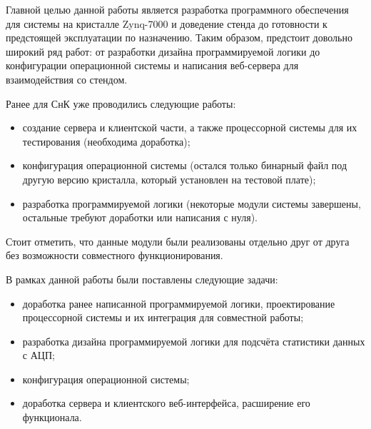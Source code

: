 Главной целью данной работы является разработка программного обеспечения для системы на кристалле Zynq-7000 и доведение стенда до готовности к предстоящей эксплуатации по назначению. Таким образом, предстоит довольно широкий ряд работ: от разработки дизайна программируемой логики до конфигурации операционной системы и написания веб-сервера для взаимодействия со стендом.\par
Ранее для СнК уже проводились следующие работы:
\begin{itemize}
    \item создание сервера и клиентской части, а также процессорной системы для их тестирования (необходима доработка);
    \item конфигурация операционной системы (остался только бинарный файл под другую версию кристалла, который установлен на тестовой плате);
    \item разработка программируемой логики (некоторые модули системы завершены, остальные требуют доработки или написания с нуля).
\end{itemize}\par
Стоит отметить, что данные модули были реализованы отдельно друг от друга без возможности совместного функционирования.\par
В рамках данной работы были поставлены следующие задачи:
\begin{itemize}
    \item доработка ранее написанной программируемой логики, проектирование процессорной системы и их интеграция для совместной работы;
    \item разработка дизайна программируемой логики для подсчёта статистики данных с АЦП;
    \item конфигурация операционной системы;
    \item доработка сервера и клиентского веб-интерфейса, расширение его функционала.
\end{itemize}

